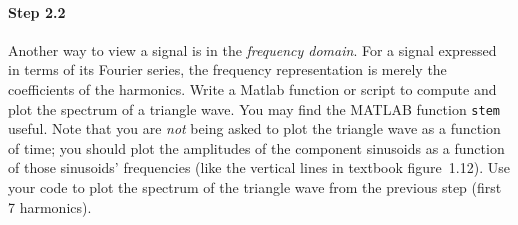 \paragraph{Step 2.2} Another way to view a signal is in the
\emph{frequency domain}. For a signal expressed in terms of its
Fourier series, the frequency representation is merely the
coefficients of the harmonics. Write a Matlab function or script to
compute and plot the spectrum of a triangle wave. You may find the
MATLAB function \texttt{stem} useful.  Note that you are \emph{not}
being asked to plot the triangle wave as a function of time; you
should plot the amplitudes of the component sinusoids as a function of
those sinusoids' frequencies (like the vertical lines in textbook
figure~1.12).  Use your code to plot the spectrum of the triangle wave
from the previous step (first 7 harmonics).
